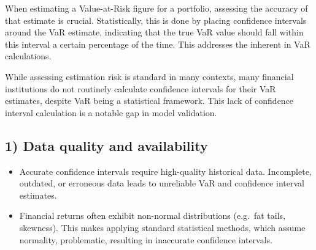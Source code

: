 
When estimating a Value-at-Risk figure for a portfolio, assessing the accuracy of that estimate
is crucial. Statistically, this is done by placing confidence intervals around the VaR estimate,
indicating that the true VaR value should fall within this interval a certain percentage of the
time. This addresses the  inherent in VaR calculations.

While assessing estimation risk is standard in many contexts, many financial institutions do not
routinely calculate confidence intervals for their VaR estimates, despite VaR being a
statistical framework. This lack of confidence interval calculation is a notable gap in model
validation.

\subsection{1) Data quality and availability}
\begin{itemize}
\item {} Accurate confidence intervals require high-quality
      historical data. Incomplete, outdated, or erroneous data leads to unreliable VaR and
      confidence interval estimates.
\item {} Financial returns often exhibit non-normal distributions
      (e.g.\ fat tails, skewness). This makes applying standard statistical methods, which
      assume normality, problematic, resulting in inaccurate confidence intervals.
\end{itemize}

